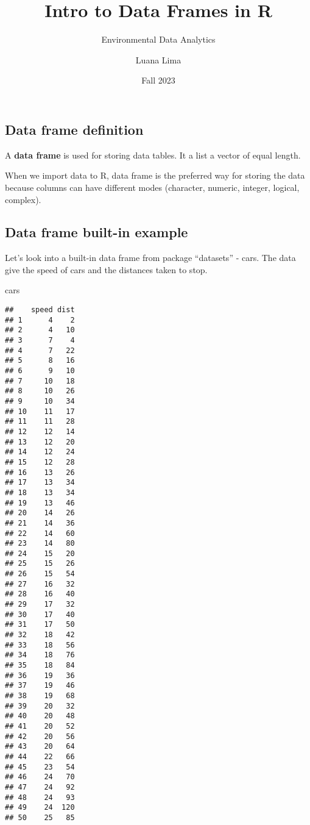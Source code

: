 \documentclass[
]{article}
\title{Intro to Data Frames in R}
\subtitle{Environmental Data Analytics}
\author{Luana Lima}
\date{Fall 2023}
\newenvironment{Shaded}{\begin{snugshade}}{\end{snugshade}}
\newcommand{\NormalTok}[1]{#1}
\begin{document}
\maketitle

\hypertarget{data-frame-definition}{%
\subsection{Data frame definition}\label{data-frame-definition}}

A \textbf{data frame} is used for storing data tables. It a list a
vector of equal length.

When we import data to R, data frame is the preferred way for storing
the data because columns can have different modes (character, numeric,
integer, logical, complex).

\hypertarget{data-frame-built-in-example}{%
\subsection{Data frame built-in
example}\label{data-frame-built-in-example}}

Let's look into a built-in data frame from package ``datasets'' - cars.
The data give the speed of cars and the distances taken to stop.

\begin{Shaded}
\begin{Highlighting}[]
\NormalTok{cars}
\end{Highlighting}
\end{Shaded}

\begin{verbatim}
##    speed dist
## 1      4    2
## 2      4   10
## 3      7    4
## 4      7   22
## 5      8   16
## 6      9   10
## 7     10   18
## 8     10   26
## 9     10   34
## 10    11   17
## 11    11   28
## 12    12   14
## 13    12   20
## 14    12   24
## 15    12   28
## 16    13   26
## 17    13   34
## 18    13   34
## 19    13   46
## 20    14   26
## 21    14   36
## 22    14   60
## 23    14   80
## 24    15   20
## 25    15   26
## 26    15   54
## 27    16   32
## 28    16   40
## 29    17   32
## 30    17   40
## 31    17   50
## 32    18   42
## 33    18   56
## 34    18   76
## 35    18   84
## 36    19   36
## 37    19   46
## 38    19   68
## 39    20   32
## 40    20   48
## 41    20   52
## 42    20   56
## 43    20   64
## 44    22   66
## 45    23   54
## 46    24   70
## 47    24   92
## 48    24   93
## 49    24  120
## 50    25   85
\end{verbatim}
\end{document}
